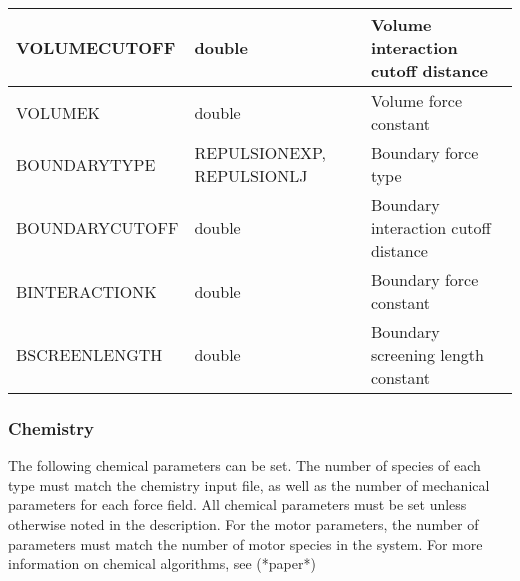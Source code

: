\documentclass[11pt, oneside]{article}   	%
\begin{document}
\begin{longtable}{|L{4.65cm}|C{4cm}|L{4cm}|}
  \hline
   VOLUMECUTOFF & double & Volume interaction cutoff distance\\
  \hline
  VOLUMEK & double & Volume force constant \\
  \hline
  BOUNDARYTYPE & REPULSIONEXP, REPULSIONLJ & Boundary force type \\
  \hline
   BOUNDARYCUTOFF & double & Boundary interaction cutoff distance\\
  \hline
  BINTERACTIONK & double & Boundary force constant \\
  \hline
  BSCREENLENGTH & double & Boundary screening length constant\\
  \hline
 
\end{longtable}

\subsubsection{Chemistry}

The following chemical parameters can be set. The number of species of each type must match the chemistry input file, as well as the number of mechanical parameters for each force field. All chemical parameters must be set unless otherwise noted in the description. For the motor parameters, the number of parameters must match the number of motor species in the system. For more information on chemical algorithms, see (*paper*)
\end{document}
